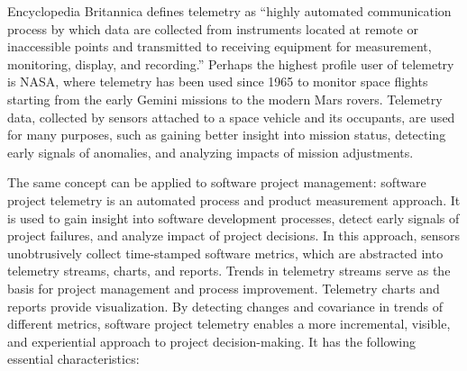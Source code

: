 Encyclopedia Britannica defines telemetry as ``highly automated communication process by which data are collected from instruments located at remote or inaccessible points and transmitted to receiving equipment for measurement, monitoring, display, and recording.'' Perhaps the highest profile user of telemetry is NASA, where telemetry has been used since 1965 to monitor space flights starting from the early Gemini missions to the modern Mars rovers. Telemetry data, collected by sensors attached to a space vehicle and its occupants, are used for many purposes, such as gaining better insight into mission status, detecting early signals of anomalies, and analyzing impacts of mission adjustments.

The same concept can be applied to software project management: software project telemetry is an automated process and product measurement approach. It is used to gain insight into software development processes, detect early signals of project failures, and analyze impact of project decisions. In this approach, sensors unobtrusively collect time-stamped software metrics, which are abstracted into telemetry streams, charts, and reports. Trends in telemetry streams serve as the basis for project management and process improvement. Telemetry charts and reports provide visualization. By detecting changes and covariance in trends of different metrics, software project telemetry enables a more incremental, visible, and experiential approach to project decision-making. It has the following essential characteristics:


